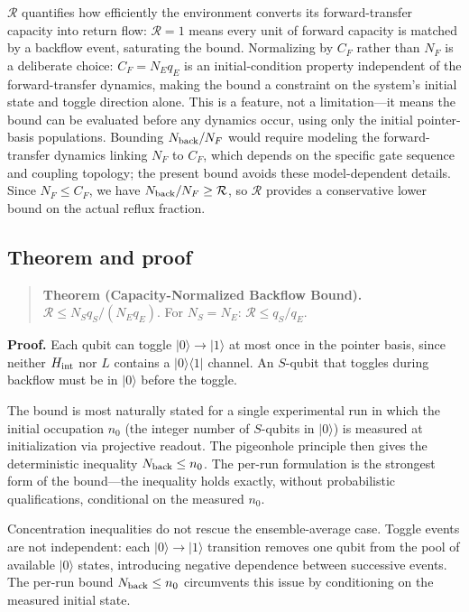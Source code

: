 \documentclass[aps,pra,twocolumn,superscriptaddress,floatfix]{revtex4-2}
\begin{document}
$\mathcal{R}$ quantifies how efficiently the environment converts its forward-transfer capacity into return flow: $\mathcal{R}=1$ means every unit of forward capacity is matched by a backflow event, saturating the bound. Normalizing by $C_F$ rather than $N_F$ is a deliberate choice: $C_F = N_E q_E$ is an initial-condition property independent of the forward-transfer dynamics, making the bound a constraint on the system's initial state and toggle direction alone. This is a feature, not a limitation---it means the bound can be evaluated before any dynamics occur, using only the initial pointer-basis populations. Bounding $N_{\rm back}/N_F$ would require modeling the forward-transfer dynamics linking $N_F$ to $C_F$, which depends on the specific gate sequence and coupling topology; the present bound avoids these model-dependent details. Since $N_F \leq C_F$, we have $N_{\rm back}/N_F \geq \mathcal{R}$, so $\mathcal{R}$ provides a conservative lower bound on the actual reflux fraction.

\subsection{Theorem and proof}

\begin{quote}
\textbf{Theorem (Capacity-Normalized Backflow Bound).}
$\mathcal{R} \leq N_S q_S / (N_E q_E)$.
For $N_S = N_E$: $\mathcal{R} \leq q_S/q_E$.
\end{quote}

\textbf{Proof.}
Each qubit can toggle $|0\rangle \to |1\rangle$ at most once in the pointer basis, since neither $H_{\rm int}$ nor $L$ contains a $|0\rangle\langle 1|$ channel. An $S$-qubit that toggles during backflow must be in $|0\rangle$ before the toggle.

The bound is most naturally stated for a single experimental run in which the initial occupation $n_0$ (the integer number of $S$-qubits in $|0\rangle$) is measured at initialization via projective readout. The pigeonhole principle then gives the deterministic inequality $N_{\rm back} \leq n_0$. The per-run formulation is the strongest form of the bound---the inequality holds exactly, without probabilistic qualifications, conditional on the measured $n_0$.

Concentration inequalities do not rescue the ensemble-average case. Toggle events are not independent: each $|0\rangle \to |1\rangle$ transition removes one qubit from the pool of available $|0\rangle$ states, introducing negative dependence between successive events. The per-run bound $N_{\rm back} \leq n_0$ circumvents this issue by conditioning on the measured initial state.
\end{document}

